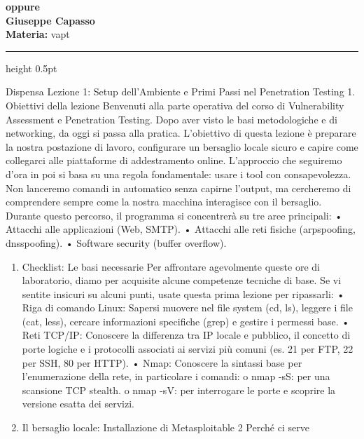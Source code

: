 \documentclass[11pt,a4paper]{article}
\newcommand{\proposaltitle}[1]{
    \begin{center}
        \vspace*{0.1cm}
        {\LARGE \bfseries \color{blue} #1} \\[1.5ex]
        {\large \textbf{Giuseppe Capasso}} \\[1ex]
                \small{
            \vspace{0.1cm}
            \textbf{Materia:} vapt\\
        }
            \end{center}
    \vspace{0.3cm}
    \hrule height 0.5pt
    \vspace{0.5cm}
}
\begin{document}
\proposaltitle{oppure}

Dispensa Lezione 1: Setup dell'Ambiente e Primi Passi nel Penetration
Testing 1. Obiettivi della lezione Benvenuti alla parte operativa del
corso di Vulnerability Assessment e Penetration Testing. Dopo aver visto
le basi metodologiche e di networking, da oggi si passa alla pratica.
L'obiettivo di questa lezione è preparare la nostra postazione di
lavoro, configurare un bersaglio locale sicuro e capire come collegarci
alle piattaforme di addestramento online. L'approccio che seguiremo
d'ora in poi si basa su una regola fondamentale: usare i tool con
consapevolezza. Non lanceremo comandi in automatico senza capirne
l'output, ma cercheremo di comprendere sempre come la nostra macchina
interagisce con il bersaglio. Durante questo percorso, il programma si
concentrerà su tre aree principali: • Attacchi alle applicazioni (Web,
SMTP). • Attacchi alle reti fisiche (arpspoofing, dnsspoofing). •
Software security (buffer overflow).

\begin{enumerate}
\def\labelenumi{\arabic{enumi}.}
\setcounter{enumi}{1}
\item
  Checklist: Le basi necessarie Per affrontare agevolmente queste ore di
  laboratorio, diamo per acquisite alcune competenze tecniche di base.
  Se vi sentite insicuri su alcuni punti, usate questa prima lezione per
  ripassarli: • Riga di comando Linux: Sapersi muovere nel file system
  (cd, ls), leggere i file (cat, less), cercare informazioni specifiche
  (grep) e gestire i permessi base. • Reti TCP/IP: Conoscere la
  differenza tra IP locale e pubblico, il concetto di porte logiche e i
  protocolli associati ai servizi più comuni (es. 21 per FTP, 22 per
  SSH, 80 per HTTP). • Nmap: Conoscere la sintassi base per
  l'enumerazione della rete, in particolare i comandi: o nmap -sS: per
  una scansione TCP stealth. o nmap -sV: per interrogare le porte e
  scoprire la versione esatta dei servizi.
\item
  Il bersaglio locale: Installazione di Metasploitable 2 Perché ci serve
\end{enumerate}
\end{document}
